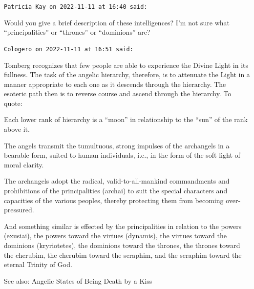 \begin{footnotesize}
\begin{sffamily}
\texttt{Patricia Kay on 2022-11-11 at 16:40 said: }

Would you give a brief description of these intelligences? I'm not sure what “principalities” or “thrones”
or “dominions” are?

\hfill

\texttt{Cologero on 2022-11-11 at 16:51 said: }

Tomberg recognizes that few people are able to experience the Divine Light in its fullness. The task of the angelic
hierarchy, therefore, is to attenuate the Light in a manner appropriate to each one as it descends through the
hierarchy. The esoteric path then is to reverse course and ascend through the hierarchy. To quote:

Each lower rank of hierarchy is a “moon” in relationship to the “sun” of the rank above it.

The angels transmit the tumultuous, strong impulses of the archangels in a bearable form, suited to human individuals,
i.e., in the form of the soft light of moral clarity.

The archangels adopt the radical, valid-to-all-mankind commandments and prohibitions of the principalities (archai) to
suit the special characters and capacities of the various peoples, thereby protecting them from becoming
over-pressured.

And something similar is effected by the principalities in relation to the powers (exusiai), the powers toward the
virtues (dynamis), the virtues toward the dominions (kryriotetes), the dominions toward the thrones, the thrones toward
the cherubim, the cherubim toward the seraphim, and the seraphim toward the eternal Trinity of God.

See also:\newline
Angelic States of Being\newline
Death by a Kiss

\hfill
\end{sffamily}
\end{footnotesize}
